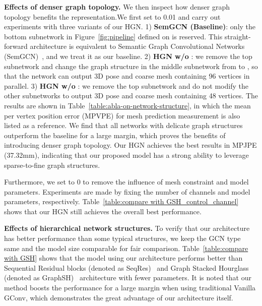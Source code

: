 \documentclass{bmvc2k}
\begin{document}
{\bf Effects of denser graph topology.} We then inspect how denser graph topology benefits the representation.We first set  to 0.01 and carry out experiments with three variants of our HGN. 1) {\bf SemGCN (Baseline)}: only the bottom subnetwork in Figure~\ref{fig:pipeline} defined on   is reserved. This straight-forward architecture is equivalent to Semantic Graph Convolutional Networks (SemGCN)~\cite{zhao2019semantic}, and we treat it as our baseline. 2) {\bf HGN w/o }: we remove the top subnetwork and change the graph structure in the middle subnetwork from  to , so that the network can output 3D pose and coarse mesh  containing 96 vertices in parallel. 3) {\bf HGN w/o }: we remove the top subnetwork and do not modify the other subnetworks to output 3D pose and coarse mesh  containing 48 vertices. The results are shown in Table~\ref{table:abla-on-network-structure}, in which the mean per vertex position error (MPVPE) for mesh prediction measurement is also listed as a reference. We find that all networks with delicate graph structures outperform the baseline for a large margin, which proves the benefits of introducing denser graph topology. Our HGN achieves the best results in MPJPE (37.32mm), indicating that our proposed model has a strong ability to leverage sparse-to-fine graph structures.

Furthermore, we set  to 0 to remove the influence of mesh constraint and model parameters. Experiments are made by fixing the number of channels and model parameters, respectively. Table~\ref{table:compare with GSH_control_channel} shows that our HGN still achieves the overall best performance.











{\bf Effects of hierarchical network structures.}
To verify that our architecture has better performance than some typical structures, we keep the GCN type same and the model size comparable for fair comparison. Table~\ref{table:compare with GSH} shows that the model using our architecture performs better than Sequential Residual blocks (denoted as SeqRes)~\cite{zhao2019semantic} and Graph Stacked Hourglass (denoted as GraphSH)~\cite{2021Graph} architecture with fewer parameters. It is noted that our method boosts the performance for a large margin when using traditional Vanilla GConv, which demonstrates the great advantage of our architecture itself. 
\end{document}
